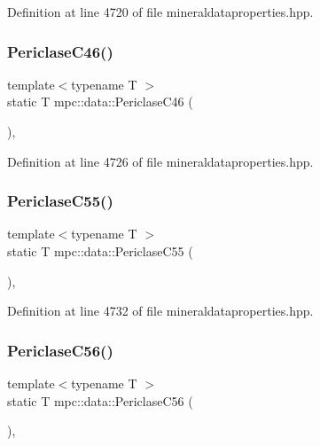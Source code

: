 Definition at line 4720 of file mineraldataproperties.\+hpp.

\mbox{\label{namespacempc_1_1data_a2751b35f5b9d8950e0d642d189bcb0dc}} 
\subsubsection{\texorpdfstring{Periclase\+C46()}{PericlaseC46()}}
{\footnotesize\ttfamily template$<$typename T $>$ \\
static T mpc\+::data\+::\+Periclase\+C46 (\begin{DoxyParamCaption}{ }\end{DoxyParamCaption})\hspace{0.3cm}{\ttfamily [inline]}, {\ttfamily [static]}}



Definition at line 4726 of file mineraldataproperties.\+hpp.

\mbox{\label{namespacempc_1_1data_a2417becad91c07a960c10cbcbf191281}} 
\subsubsection{\texorpdfstring{Periclase\+C55()}{PericlaseC55()}}
{\footnotesize\ttfamily template$<$typename T $>$ \\
static T mpc\+::data\+::\+Periclase\+C55 (\begin{DoxyParamCaption}{ }\end{DoxyParamCaption})\hspace{0.3cm}{\ttfamily [inline]}, {\ttfamily [static]}}



Definition at line 4732 of file mineraldataproperties.\+hpp.

\mbox{\label{namespacempc_1_1data_a53217114578e10b84a87266893aef8c0}} 
\subsubsection{\texorpdfstring{Periclase\+C56()}{PericlaseC56()}}
{\footnotesize\ttfamily template$<$typename T $>$ \\
static T mpc\+::data\+::\+Periclase\+C56 (\begin{DoxyParamCaption}{ }\end{DoxyParamCaption})\hspace{0.3cm}{\ttfamily [inline]}, {\ttfamily [static]}}



